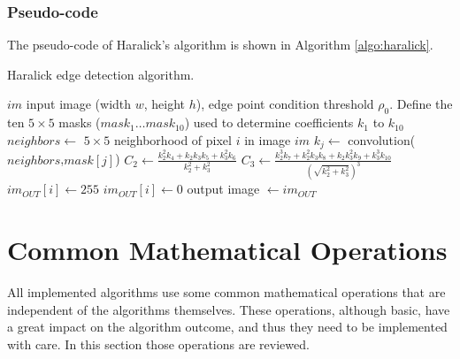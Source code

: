 \documentclass{ipol}
\numberwithin{equation}{section}
\numberwithin{table}{section}
\begin{document}
\subsubsection{Pseudo-code}

The pseudo-code of Haralick's algorithm is shown in Algorithm \ref{algo:haralick}.

\begin{algorithm}[t]
\caption{Haralick edge detection algorithm.}
\label{algo:haralick}
\begin{algorithmic}[1]
\REQUIRE $im$ input image (width $w$, height $h$), edge point condition threshold $\rho_0$.
\STATE Define the ten $5\times5$ masks ($mask_1\dots mask_{10}$) used to determine coefficients $k_1$ to $k_{10}$ 
	\STATE $neighbors \leftarrow$ $5\times5$ neighborhood of pixel $i$ in image $im$
		\STATE $k_j \leftarrow$ convolution($neighbors$,$mask[j]$)
	\ENDFOR
	\STATE $C_2 \leftarrow \frac{k_2^2k_4 + k_2k_3k_5 + k_3^2k_6}{k_2^2 + k_3^2}$
	\STATE $C_3 \leftarrow \frac{k_2^3k_7 + k_2^2k_3k_8 + k_2k_3^2k_9 + k_3^3k_{10}}{(\sqrt{k_2^2 + k_3^2})^3}$
		\STATE $im_{OUT}[i] \leftarrow 255$
	\ELSE
		\STATE $im_{OUT}[i] \leftarrow 0$
	\ENDIF
\ENDFOR
\RETURN output image $\leftarrow im_{OUT}$
\end{algorithmic}
\end{algorithm}


\section{Common Mathematical Operations}
\label{sec:appendix1}

All implemented algorithms use some common mathematical operations that are independent of the algorithms themselves. 
These operations, although basic, have a great impact on the algorithm outcome, and thus they need to be 
implemented with care. In this section those operations are reviewed.


\end{document}
